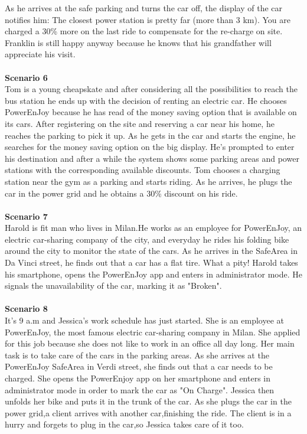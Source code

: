 \documentclass[11pt,a4paper]{report}
\begin{document}
As he arrives at the safe parking and turns the car off, the display of the car notifies him: The closest power station is pretty far (more than 3 km). You are charged a 30\% more on the last ride to compensate for the re-charge on site. Franklin is still happy anyway because he knows that his grandfather will appreciate his visit.\\ 
\noindent \\
\textbf{Scenario 6}\\
Tom is a young cheapskate and after considering all the possibilities to reach the bus station he ends up with the decision of renting an electric car. He chooses PowerEnJoy because he has read of the money saving option that is available on its cars. After registering on the site and reserving a car near his home, he reaches the parking to pick it up. As he gets in the car and starts the engine, he searches for the money saving option on the big display. He's prompted to enter his destination and after a while the system shows some parking areas and power stations with the corresponding available discounts. Tom chooses a charging station near the gym as a parking and starts riding. As he arrives, he plugs the car in the power grid and he obtains a 30\% discount on his ride.\\
\noindent \\
\textbf{Scenario 7}\\ 
Harold is fit man who lives in Milan.He works as an employee for PowerEnJoy, an electric car-sharing company of the city, and everyday he rides his folding bike around the city to monitor the state of the cars. As he arrives in the SafeArea in Da Vinci street, he finds out  that a car has a flat tire. What a pity! Harold takes his smartphone, opens the PowerEnJoy app and enters in administrator mode. He signals the unavailability of the car, marking it as "Broken".\\
\noindent \\
\textbf{Scenario 8}\\
It's 9 a.m and Jessica's work schedule has just started. She is an employee at PowerEnJoy, the most famous electric car-sharing company in Milan. She applied for this job because she does not like to work in an office all day long. Her main task is to take care of the cars in the parking areas.
As she arrives at the PowerEnJoy SafeArea in Verdi street, she finds out that a car needs to be charged. She opens the PowerEnjoy app on her smartphone and enters in administrator mode in order to mark the car as "On Charge". Jessica then unfolds her bike and puts it in the trunk of the car.
As she plugs the car in the power grid,a client arrives with another car,finishing the ride. The client is in a hurry and forgets to plug in the car,so Jessica takes care of it too.\\
\end{document}
